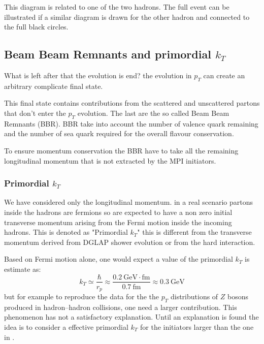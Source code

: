 This diagram is related to one of the two hadrons. The full event can be illustrated if a similar diagram is drawn for the other hadron and connected to the full black circles.

\subsection{Beam Beam Remnants and primordial $k_T$}

What is left after that the evolution is end? the evolution in $p_T$ can create an arbitrary complicate final state. 

This final state contains contributions from the scattered and unscattered partons that don't enter the $p_T$ evolution. The last are the so called Beam Beam Remnants (BBR). 
BBR take into account the number of valence quark remaining and the number of sea quark required for the overall flavour conservation.

To ensure momentum conservation the BBR have to take all the remaining longitudinal momentum that is not extracted by the MPI initiators.

\subsubsection*{Primordial $k_T$}

We have considered only the longitudinal momentum. in a real scenario partons inside the hadrons are fermions so are expected to have a non zero initial transverse momentum arising from the Fermi motion inside the incoming hadrons. This is denoted as "Primordial $k_T$" this is different from the transverse momentum derived from DGLAP shower evolution or from the hard interaction.

\bigskip

Based on Fermi motion alone, one would expect a value of the primordial $k_T$ is estimate as: 
\begin{equation}
	k_T\simeq\frac{\hbar}{r_p}\approx\frac{0.2\ \mathrm{GeV\cdot fm}}{0.7\ \mathrm{fm}}\approx0.3\ \mathrm{GeV}
\label{eq:PrimordialKT}
\end{equation}
but for example to reproduce the data for the the $p_T$ distributions of $Z$ bosons produced in hadron–hadron collisions, one need a larger contribution. This phenomenon has not a satisfactory explanation. Until an explanation is found the idea is to consider a effective primordial $k_T$ for the initiators larger than the one in .

